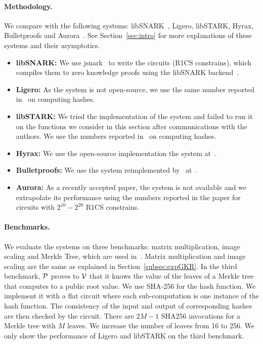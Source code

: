 \paragraph{Methodology.} We compare with the following systems: libSNARK~\cite{libsnark}, Ligero\cite{ligero}, libSTARK\cite{libstark}, Hyrax\cite{hyrax},  Bulletproofs\cite{bulletproofs} and Aurora~\cite{}. See Section~\ref{sec:intro} for more explanations of these systems and their asymptotics. 
\begin{itemize}
\item \textbf{libSNARK:} We use jsnark~\cite{jsnark} to write the circuits (R1CS constrains), which compiles them to zero knowledge proofs using the libSNARK backend~\cite{??}. 

\item\textbf{Ligero:} As the system is not open-source, we use the same number reported in~\cite{ligero} on computing hashes.

\item\textbf{libSTARK:} We tried the implementation of the system and failed to run it on the functions we consider in this section after communications with the authors. We use the numbers reported in~\cite{libstark} on computing hashes. 

\item\textbf{Hyrax:} We use the open-source implementation the system at~\cite{??}.

\item\textbf{Bulletproofs:} We use the system reimplemented by~\cite{hyrax} at~\cite{??}.


\item\textbf{Aurora:} As a recently accepted paper, the system is not available and we extrapolate its performance using the numbers reported in the paper for circuits with $2^{10}-2^{20}$ R1CS constrains.

\end{itemize}


\paragraph{Benchmarks.} We evaluate the systems on three benchmarks: matrix multiplication, image scaling and Merkle Tree\cite{merkletree}, which are used in~\cite{hyrax}. Matrix multiplication and image scaling are the same as explained in Section~\ref{subsec:expGKR}. In the third benchmark, $\P$ proves to $\V$ that it knows the value of the leaves of a Merkle tree\cite{merkletree} that computes to a public root value\cite{blum1994checking}. We use SHA-256 for the hash function. We implement it with a flat circuit where each sub-computation is one instance of the hash function. The consistency of the input and output of corresponding hashes are then checked by the circuit. There are $2M - 1$ SHA256 invocations for a Merkle tree with $M$ leaves. We increase the number of leaves from 16 to 256. We only show the performance of Ligero and libSTARK on the third benchmark.

